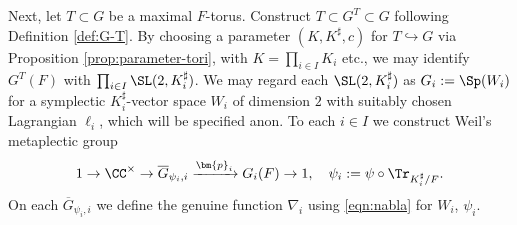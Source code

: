 \documentclass[a4paper,10pt]{article}
\begin{document}
Next, let $T \subset G$ be a maximal $F$-torus. Construct $T \subset G^T \subset G$ following Definition \ref{def:G-T}. By choosing a parameter $(K, K^\sharp, c)$ for $T \hookrightarrow G$ via Proposition \ref{prop:parameter-tori}, with $K = \prod_{i \in I} K_i$ etc., we may identify $G^T(F)$ with $\prod_{i \in I} \SL(2, K_i^\sharp)$. We may regard each $\SL(2, K_i^\sharp)$ as $G_i := \Sp(W_i)$ for a symplectic $K_i^\sharp$-vector space $W_i$ of dimension $2$ with suitably chosen Lagrangian $\ell_i$, which will be specified anon. To each $i \in I$ we construct Weil's metaplectic group
\[ 1 \to \CC^\times \to \overline{G}_{\psi_i, i} \xrightarrow{\bm{p}_i} G_i(F) \to 1, \quad \psi_i := \psi \circ \Tr_{K_i^\sharp/F}. \]
On each $\overline{G}_{\psi_i, i}$ we define the genuine function $\nabla_i$ using \eqref{eqn:nabla} for $W_i$, $\psi_i$.
\end{document}
